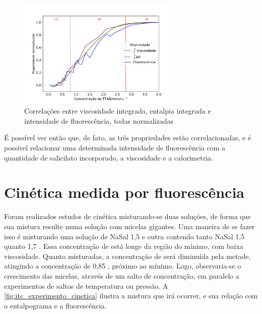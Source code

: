 	\begin{figure}[h]
		\centering
		\includegraphics[width=0.7\textwidth]{imagens/fluor/correlacoes_propriedades_zoom}
		\caption{Correlações entre viscosidade integrada, entalpia integrada e intensidade de fluorescência, todas normalizadas}
		\label{fig:correlacoes_propriedades_zoom}
	\end{figure}
	
	É possível ver então que, de fato, as três propriedades estão correlacionadas, e é possível relacionar uma determinada intensidade de fluorescência com a quantidade de salicilato incorporado, a viscosidade e a calorimetria.

	\FloatBarrier	
	
	\section{Cinética medida por fluorescência} 
	
	Foram realizados estudos de cinética misturando-se duas soluções, de forma que sua mistura resulte numa solução com micelas gigantes. Uma maneira de se fazer isso é misturando uma solução de NaSal 1,5 \mM{} e outra contendo tanto NaSal 1,5 \mM{} quanto \TTAB{} 1,7 \mM. Essa concentração de \TTAB{} está longe da região do mínimo, com baixa viscosidade. Quanto misturadas, a concentração de \TTAB{} será diminuída pela metade, atingindo a concentração de 0,85 \mM{}, próximo ao mínimo. Logo, observaria-se o crescimento das micelas, através de um salto de concentração, em paralelo a experimentos de saltos de temperatura ou pressão.\cite{Hoffmann2012a} A \autoref{fig:itc_experimento_cinetica} ilustra a mistura que irá ocorrer, e sua relação com o entalpograma e a fluorescência.
	

